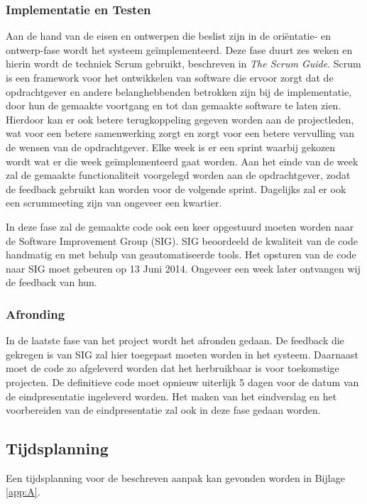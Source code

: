 \subsubsection{Implementatie en Testen}
Aan de hand van de eisen en ontwerpen die beslist zijn in de ori\"entatie- en ontwerp-fase wordt het systeem ge\"implementeerd. Deze fase duurt zes weken en hierin wordt de techniek Scrum gebruikt, beschreven in \emph{The Scrum Guide}. Scrum is een framework voor het ontwikkelen van software die ervoor zorgt dat de opdrachtgever en andere belanghebbenden betrokken zijn bij de implementatie, door hun de gemaakte voortgang en tot dan gemaakte software te laten zien. Hierdoor kan er ook betere terugkoppeling gegeven worden aan de projectleden, wat voor een betere samenwerking zorgt en zorgt voor een betere vervulling van de wensen van de opdrachtgever. Elke week is er een sprint waarbij gekozen wordt wat er die week ge\"implementeerd gaat worden. Aan het einde van de week zal de gemaakte functionaliteit voorgelegd worden aan de opdrachtgever, zodat de feedback gebruikt kan worden voor de volgende sprint. Dagelijks zal er ook een scrummeeting zijn van ongeveer een kwartier.

In deze fase zal de gemaakte code ook een keer opgestuurd moeten worden naar de Software Improvement Group (SIG). SIG beoordeeld de kwaliteit van de code handmatig en met behulp van geautomatiseerde tools. Het opsturen van de code naar SIG moet gebeuren op 13 Juni 2014. Ongeveer een week later ontvangen wij de feedback van hun.

\subsubsection{Afronding}
In de laatste fase van het project wordt het afronden gedaan. De feedback die gekregen is van SIG zal hier toegepast moeten worden in het systeem. Daarnaast moet de code zo afgeleverd worden dat het herbruikbaar is voor toekomstige projecten. De definitieve code moet opnieuw uiterlijk 5 dagen voor de datum van de eindpresentatie ingeleverd worden. Het maken van het eindverslag en het voorbereiden van de eindpresentatie zal ook in deze fase gedaan worden.

\subsection{Tijdsplanning}
Een tijdsplanning voor de beschreven aanpak kan gevonden worden in Bijlage \ref{app:A}.\\


